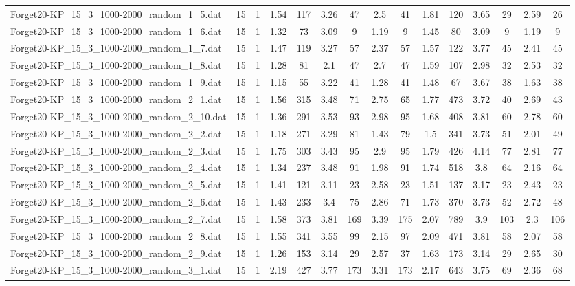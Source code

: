 \begin{table}[!ht]
{\begin{tabular}{lcccccccccccccc}
Forget20-KP\_15\_3\_1000-2000\_random\_1\_5.dat & 15 & 1 & 1.54 & 117 & 3.26 & 47 & 2.5 & 41 & 1.81 & 120 & 3.65 & 29 & 2.59 & 26 \\
Forget20-KP\_15\_3\_1000-2000\_random\_1\_6.dat & 15 & 1 & 1.32 & 73 & 3.09 & 9 & 1.19 & 9 & 1.45 & 80 & 3.09 & 9 & 1.19 & 9 \\
Forget20-KP\_15\_3\_1000-2000\_random\_1\_7.dat & 15 & 1 & 1.47 & 119 & 3.27 & 57 & 2.37 & 57 & 1.57 & 122 & 3.77 & 45 & 2.41 & 45 \\
Forget20-KP\_15\_3\_1000-2000\_random\_1\_8.dat & 15 & 1 & 1.28 & 81 & 2.1 & 47 & 2.7 & 47 & 1.59 & 107 & 2.98 & 32 & 2.53 & 32 \\
Forget20-KP\_15\_3\_1000-2000\_random\_1\_9.dat & 15 & 1 & 1.15 & 55 & 3.22 & 41 & 1.28 & 41 & 1.48 & 67 & 3.67 & 38 & 1.63 & 38 \\
Forget20-KP\_15\_3\_1000-2000\_random\_2\_1.dat & 15 & 1 & 1.56 & 315 & 3.48 & 71 & 2.75 & 65 & 1.77 & 473 & 3.72 & 40 & 2.69 & 43 \\
Forget20-KP\_15\_3\_1000-2000\_random\_2\_10.dat & 15 & 1 & 1.36 & 291 & 3.53 & 93 & 2.98 & 95 & 1.68 & 408 & 3.81 & 60 & 2.78 & 60 \\
Forget20-KP\_15\_3\_1000-2000\_random\_2\_2.dat & 15 & 1 & 1.18 & 271 & 3.29 & 81 & 1.43 & 79 & 1.5 & 341 & 3.73 & 51 & 2.01 & 49 \\
Forget20-KP\_15\_3\_1000-2000\_random\_2\_3.dat & 15 & 1 & 1.75 & 303 & 3.43 & 95 & 2.9 & 95 & 1.79 & 426 & 4.14 & 77 & 2.81 & 77 \\
Forget20-KP\_15\_3\_1000-2000\_random\_2\_4.dat & 15 & 1 & 1.34 & 237 & 3.48 & 91 & 1.98 & 91 & 1.74 & 518 & 3.8 & 64 & 2.16 & 64 \\
Forget20-KP\_15\_3\_1000-2000\_random\_2\_5.dat & 15 & 1 & 1.41 & 121 & 3.11 & 23 & 2.58 & 23 & 1.51 & 137 & 3.17 & 23 & 2.43 & 23 \\
Forget20-KP\_15\_3\_1000-2000\_random\_2\_6.dat & 15 & 1 & 1.43 & 233 & 3.4 & 75 & 2.86 & 71 & 1.73 & 370 & 3.73 & 52 & 2.72 & 48 \\
Forget20-KP\_15\_3\_1000-2000\_random\_2\_7.dat & 15 & 1 & 1.58 & 373 & 3.81 & 169 & 3.39 & 175 & 2.07 & 789 & 3.9 & 103 & 2.3 & 106 \\
Forget20-KP\_15\_3\_1000-2000\_random\_2\_8.dat & 15 & 1 & 1.55 & 341 & 3.55 & 99 & 2.15 & 97 & 2.09 & 471 & 3.81 & 58 & 2.07 & 58 \\
Forget20-KP\_15\_3\_1000-2000\_random\_2\_9.dat & 15 & 1 & 1.26 & 153 & 3.14 & 29 & 2.57 & 37 & 1.63 & 173 & 3.14 & 29 & 2.65 & 30 \\
Forget20-KP\_15\_3\_1000-2000\_random\_3\_1.dat & 15 & 1 & 2.19 & 427 & 3.77 & 173 & 3.31 & 173 & 2.17 & 643 & 3.75 & 69 & 2.36 & 68 \\

\end{tabular}}
\end{table}
